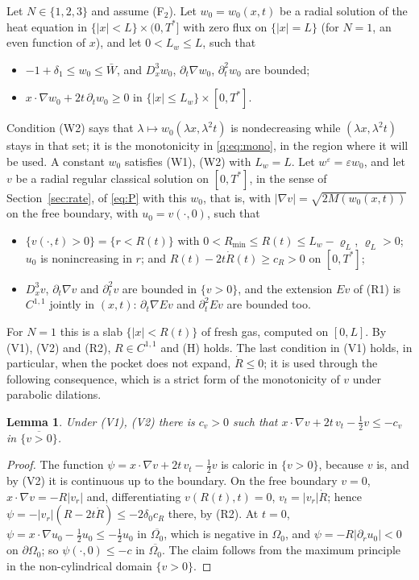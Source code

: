 \documentclass[11pt]{amsart}
\newtheorem{lemma}[theorem]{Lemma}
\theoremstyle{definition}
\theoremstyle{remark}
\newcommand{\ve}{\varepsilon}
\begin{document}
Let $N\in\{1,2,3\}$ and assume (F$_2$). Let $w_0=w_0(x,t)$ be a radial solution of the heat
equation in $\{|x|<L\}\times(0,T^*]$ with zero flux on $\{|x|=L\}$ (for $N=1$, an even
function of $x$), and let $0<L_w\le L$, such that
\begin{itemize}
\item[(W1)] $-1+\delta_1\le w_0\le\bar W$, and $D_x^3w_0$, $\partial_t\nabla w_0$, $\partial_t^2w_0$ are
bounded;
\item[(W2)] $x\cdot\nabla w_0+2t\,\partial_tw_0\ge0$ in $\{|x|\le L_w\}\times[0,T^*]$.
\end{itemize}
Condition (W2) says that $\lambda\mapsto w_0(\lambda x,\lambda^2t)$ is nondecreasing while $(\lambda x,\lambda^2t)$ stays
in that set; it is the monotonicity in \eqref{q:eq:mono}, in the region where it will be
used. A constant $w_0$ satisfies (W1), (W2) with $L_w=L$. Let $w^\ve=\ve w_0$, and let $v$ be a
radial regular classical solution on $[0,T^*]$, in the sense of Section~\ref{sec:rate}, of
\eqref{eq:P} with this $w_0$, that is, with $|\nabla v|=\sqrt{2M(w_0(x,t))}$ on the free boundary,
with $u_0=v(\cdot,0)$, such that
\begin{itemize}
\item[(V1)] $\{v(\cdot,t)>0\}=\{r<R(t)\}$ with $0<R_{\min}\le R(t)\le L_w-\varrho_L$, $\varrho_L>0$; $u_0$ is
nonincreasing in $r$; and $R(t)-2t\dot R(t)\ge c_R>0$ on $[0,T^*]$;
\item[(V2)] $D_x^3v$, $\partial_t\nabla v$ and $\partial_t^2v$ are bounded in $\{v>0\}$, and the
extension $Ev$ of (R1) is $C^{1,1}$ jointly in $(x,t)$: $\partial_t\nabla Ev$ and $\partial_t^2Ev$
are bounded too.
\end{itemize}
For $N=1$ this is a slab $\{|x|<R(t)\}$ of fresh gas, computed on $[0,L]$. By (V1), (V2) and
(R2), $R\in C^{1,1}$ and (H) holds. The last condition in (V1) holds, in particular, when
the pocket does not expand, $\dot R\le0$; it is used through the following consequence,
which is a strict form of the monotonicity of $v$ under parabolic dilations.

\begin{lemma}\label{cv:lem:dil}
Under (V1), (V2) there is $c_v>0$ such that
$x\cdot\nabla v+2t\,v_t-\frac12v\le-c_v$ in $\overline{\{v>0\}}$.
\end{lemma}

\begin{proof}
The function $\psi=x\cdot\nabla v+2t\,v_t-\frac12v$ is caloric in $\{v>0\}$, because $v$ is, and by
(V2) it is continuous up to the boundary. On the free boundary $v=0$,
$x\cdot\nabla v=-R|v_r|$ and, differentiating $v(R(t),t)=0$, $v_t=|v_r|\dot R$; hence
$\psi=-|v_r|(R-2t\dot R)\le-2\delta_0c_R$ there, by (R2). At $t=0$,
$\psi=x\cdot\nabla u_0-\frac12u_0\le-\frac12u_0$ in $\overline{\Omega_0}$, which is negative in $\Omega_0$, and
$\psi=-R|\partial_ru_0|<0$ on $\partial\Omega_0$; so $\psi(\cdot,0)\le-c$ in $\overline{\Omega_0}$. The claim follows
from the maximum principle in the non-cylindrical domain $\{v>0\}$.
\end{proof}
\end{document}
